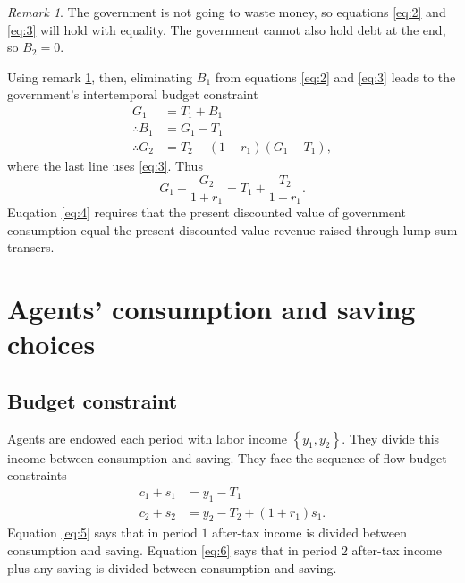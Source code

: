 \documentclass[12pt]{pracjourn_rwr}
\theoremstyle{remark}
\newtheorem{remark}{Remark}
\begin{document}
\begin{remark}
\label{remark:1}
The government is not going to waste money, so equations \eqref{eq:2} and \eqref{eq:3} will hold with equality.
The government cannot also hold debt at the end, so $B_{2} = 0$.
\end{remark}

Using remark \ref{remark:1}, then,
eliminating $B_{1}$ from equations \eqref{eq:2} and \eqref{eq:3} leads to the government's intertemporal budget constraint
\begin{align*}
G_{1} &= T_{1} + B_{1} \\
\therefore B_{1} &= G_{1} - T_{1} \\
\therefore G_{2} &= T_{2} - (1-r_{1}) \left( G_{1} - T_{1} \right),
\end{align*}
where the last line uses \eqref{eq:3}.
Thus
\begin{equation}
\label{eq:4}
G_{1} + \frac{G_{2}}{1+r_{1}} = T_{1} + \frac{T_{2}}{1+r_{1}}.
\end{equation}
Euqation \eqref{eq:4} requires that the present discounted value of government consumption equal
the present discounted value revenue raised through lump-sum transers.

\section{Agents' consumption and saving choices}

\subsection{Budget constraint}
Agents are endowed each period with labor income $\left\{ y_{1},y_{2} \right\}$.
They divide this income between consumption and saving.
They face the sequence of flow budget constraints
\begin{align}
\label{eq:5}
c_{1} + s_{1} &= y_{1} - T_{1} \\
\label{eq:6}
c_{2} + s_{2} &= y_{2} - T_{2} + (1+r_{1})s_{1}.
\end{align}
Equation \eqref{eq:5} says that in period $1$ after-tax income is divided between consumption and saving.
Equation \eqref{eq:6} says that in period $2$ after-tax income plus any saving is divided between consumption and saving.
\end{document}
